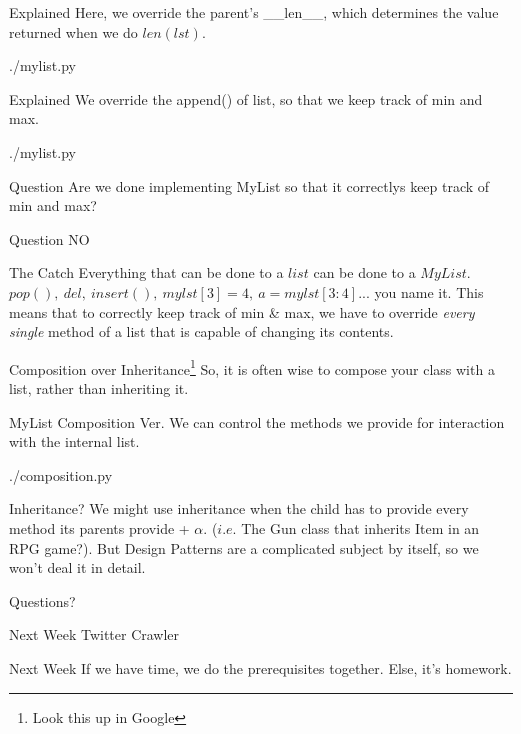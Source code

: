 \documentclass{beamer}
\begin{document}
\begin{frame}{Explained}
  Here, we override the parent's \_\_len\_\_, which determines the value
  returned when we do $len(lst)$.
  \begin{lstinputlisting}[firstline=8, lastline=10]
    {./mylist.py}
  \end{lstinputlisting}
\end{frame}

\begin{frame}{Explained}
  We override the append() of list, so that we keep track of min and max.
  \begin{lstinputlisting}[firstline=12, lastline=17]
    {./mylist.py}
  \end{lstinputlisting}
\end{frame}

\begin{frame}{Question}
  Are we done implementing MyList so that it correctlys keep track of min and max?
\end{frame}

\begin{frame}{Question}
  NO
\end{frame}

\begin{frame}{The Catch}
  Everything that can be done to a $list$ can be done to a $MyList$.\\
  $pop(),\ del,\ insert(),\ mylst[3]=4,\ a = mylst[3:4]$... you name it. This means that to
  correctly keep track of min \& max, we have to override \textit{every single} method of a list
  that is capable of changing its contents.
\end{frame}

\begin{frame}{Composition over Inheritance\footnote{Look this up in Google}}
    So, it is often wise to compose your class with a list, rather than inheriting
    it.
\end{frame}

\begin{frame}{MyList Composition Ver.}
  We can control the methods we provide for interaction with the internal list.
  \begin{lstinputlisting}[firstline=1, lastline=23]
    {./composition.py}
  \end{lstinputlisting}
\end{frame}

\begin{frame}{Inheritance?}
  We might use inheritance when the child has to provide every method its parents
  provide + $\alpha$. ($i.e.$ The Gun class that inherits Item in an RPG
  game?). But Design Patterns are a complicated subject by itself, so we won't
  deal it in detail.
\end{frame}

\begin{frame}{Questions?}
\end{frame}

\begin{frame}{Next Week}
  Twitter Crawler
\end{frame}

\begin{frame}{Next Week}
  If we have time, we do the prerequisites together.
  Else, it's homework.
\end{frame}
\end{document}
